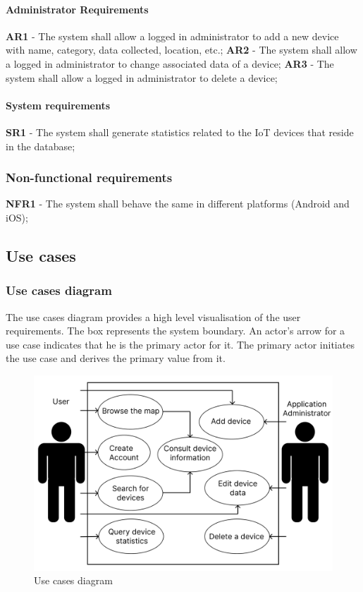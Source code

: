 \paragraph*{Administrator Requirements}

\textbf{AR1} - The system shall allow a logged in administrator to add a new device with name, category, data collected, location, etc.;
\newline
\textbf{AR2} - The system shall allow a logged in administrator to change associated data of a device;
\newline
\textbf{AR3} - The system shall allow a logged in administrator to delete a device;

\paragraph*{System requirements}

\textbf{SR1} - The system shall generate statistics related to the IoT devices that reside in the database;

\subsubsection*{Non-functional requirements}

\textbf{NFR1} - The system shall behave the same in different platforms (Android and iOS);

\subsection*{Use cases}

\subsubsection*{Use cases diagram}

The use cases diagram provides a high level visualisation of the user
requirements. The box represents the system boundary. An actor's arrow
for a use case indicates that he is the primary actor for it.
The primary actor initiates the use case and derives the primary value
from it.
\begin{figure}[H]
    \centering
    \includegraphics[width=15cm]{../app/docs/software_requirements/assets/images/use_cases_diagram.png}
    \caption{Use cases diagram}
    \label{fig:use cases diagram}
\end{figure}

